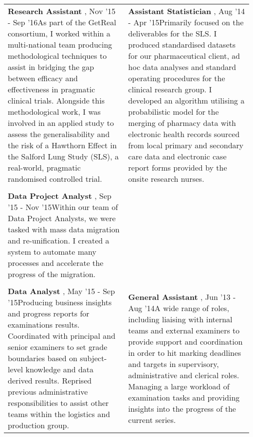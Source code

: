 \documentclass[
]{article}
\begin{document}
\begin{table}[H]
\begin{table}[H]
\begin{tabular}{>{\raggedright\arraybackslash}p{}>{\raggedright\arraybackslash}p{}}
\hspace{1em}\textbf{ Research Assistant }, Nov '15 - Sep '16\newline As part of the GetReal consortium, I worked within a multi-national team producing methodological techniques to assist in bridging the gap between efficacy and effectiveness in pragmatic clinical trials. Alongside this methodological work, I was involved in an applied study to assess the generalisability and the risk of a Hawthorn Effect in the Salford Lung Study (SLS), a real-world, pragmatic randomised controlled trial. & \textbf{ Assistant Statistician }, Aug '14 - Apr '15\newline Primarily focused on the deliverables for the SLS. I produced standardised datasets for our pharmaceutical client, ad hoc data analyses and standard operating procedures for the clinical research group. I developed an algorithm utilising a probabilistic model for the merging of pharmacy data with electronic health records sourced from local primary and secondary care data and electronic case report forms provided by the onsite research nurses.\\
[0.3em]
\multicolumn{2}{l}{\textit{\textbf{Brammer UK}}}\\
\hline
\hspace{1em}\textbf{ Data Project Analyst }, Sep '15 - Nov '15\newline Within our team of Data Project Analysts, we were tasked with mass data migration and re-unification. I created a system to automate many processes and accelerate the progress of the migration. & \\
[0.3em]
\multicolumn{2}{l}{\textit{\textbf{AQA}}}\\
\hline
\hspace{1em}\textbf{ Data Analyst }, May '15 - Sep '15\newline Producing business insights and progress reports for examinations results. Coordinated with principal and senior examiners to set grade boundaries based on subject-level knowledge and data derived results. Reprised previous administrative responsibilities to assist other teams within the logistics and production group. & \textbf{ General Assistant }, Jun '13 - Aug '14\newline A wide range of roles, including liaising with internal teams and external examiners to provide support and coordination in order to hit marking deadlines and targets in supervisory, administrative and clerical roles. Managing a large workload of examination tasks and providing insights into the progress of the current series.\\
\bottomrule
\end{tabular}
\end{table}
\end{table}
\end{document}
